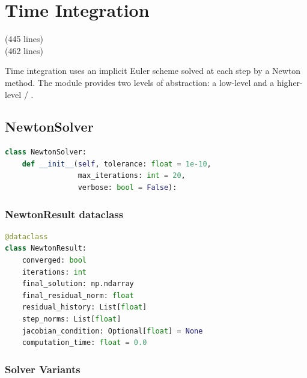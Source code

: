 \section{Time Integration}
\label{sec:time_integration}

\begin{center}
 \quad(445 lines) \\
 \quad(462 lines)
\end{center}

Time integration uses an implicit Euler scheme solved at each step by a
Newton method.  The module provides two levels of abstraction: a low-level
 and a higher-level  /
.

\subsection{NewtonSolver}

\begin{lstlisting}[language=Python, caption={NewtonSolver constructor}]
class NewtonSolver:
    def __init__(self, tolerance: float = 1e-10,
                 max_iterations: int = 20,
                 verbose: bool = False):
\end{lstlisting}

\subsubsection{NewtonResult dataclass}

\begin{lstlisting}[language=Python, caption={NewtonResult fields}]
@dataclass
class NewtonResult:
    converged: bool
    iterations: int
    final_solution: np.ndarray
    final_residual_norm: float
    residual_history: List[float]
    step_norms: List[float]
    jacobian_condition: Optional[float] = None
    computation_time: float = 0.0
\end{lstlisting}

\subsubsection{Solver Variants}

